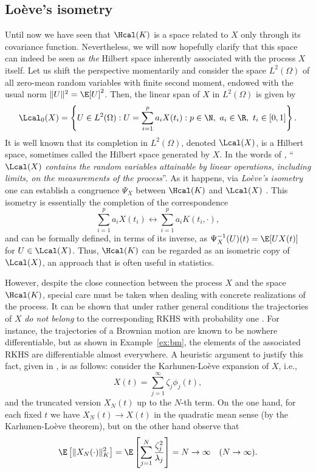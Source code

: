 \subsection*{Loève's isometry}

Until now we have seen that \(\Hcal(K)\) is a space related to \(X\) only through its covariance function. Nevertheless, we will now hopefully clarify that this space can indeed be seen as \textit{the} Hilbert space inherently associated with the process \(X\) itself. Let us shift the perspective momentarily and consider the space \(L^2(\Omega)\) of all zero-mean random variables with finite second moment, endowed with the usual norm \(\|U\|^2=\E[U]^2\). Then, the linear span of \(X\) in \(L^2(\Omega)\) is given by
\[
\Lcal_0(X) = \left\{U \in L^2(\Omega): U = \sum_{i=1}^p a_i X(t_i): p\in\N, \ a_i \in \R, \ t_i \in [0,1]\right\}.
\]
It is well known that its completion in \(L^2(\Omega)\), denoted \(\Lcal(X)\), is a Hilbert space, sometimes called the Hilbert space generated by \(X\). In the words of \citet{berlinet2004reproducing}, ``\(\Lcal(X)\) \textit{contains the random variables attainable by linear operations, including limits, on the measurements of the process}''. As it happens, via \textit{Loève's isometry} \citep{loeve1948fonctions} one can establish a congruence \(\Psi_X\) between \(\Hcal(K)\) and \(\Lcal(X)\) \citep[see Lemma 1.1 in][]{lukic2001stochastic}. This isometry is essentially the completion of the correspondence
  \begin{equation}\label{eq:loeves-isometry}
  \sum_{i=1}^p a_i X(t_i) \longleftrightarrow \sum_{i=1}^p a_i K(t_i, \cdot),
  \end{equation}
and can be formally defined, in terms of its inverse, as \(\Psi^{-1}_X(U)(t) = \E[U X(t)]\) for \(U \in \Lcal(X)\). Thus, \(\Hcal(K)\) can be regarded as an isometric copy of \(\Lcal(X)\), an approach that is often useful in statistics.

However, despite the close connection between the process \(X\) and the space \(\Hcal(K)\), special care must be taken when dealing with concrete realizations of the process. It can be shown that under rather general conditions the trajectories of \(X\) \textit{do not belong} to the corresponding RKHS with probability one \citep[see for example][Cor.~7.1]{lukic2001stochastic}. For instance, the trajectories of a Brownian motion are known to be nowhere differentiable, but as shown in Example~\ref{ex:bm}, the elements of the associated RKHS are differentiable almost everywhere. A heuristic argument to justify this fact, given in \citet{wahba1990spline}, is as follows: consider the Karhunen-Loève expansion of \(X\), i.e.,
\[
  X(t) = \sum_{j=1}^\infty \zeta_j \phi_j(t),
\]
and the truncated version \(X_N(t)\) up to the \(N\)-th term. On the one hand, for each fixed \(t\) we have \(X_N(t)\to X(t)\) in the quadratic mean sense (by the Karhunen-Loève theorem), but on the other hand observe that
\[
  \E\left[\|X_N(\cdot)\|^2_K\right] = \E \left[\sum_{j=1}^N \frac{\zeta_j^2}{\lambda_j}\right] = N \to \infty \quad (N\to\infty).
\]

